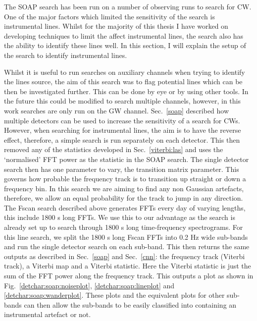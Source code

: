 The SOAP search has been run on a number of observing runs to search for \ac{CW}. 
One of the major factors which limited the sensitivity of the search is instrumental lines. 
Whilst for the majority of this thesis I have worked on developing techniques to limit the affect instrumental lines, the search also has the ability to identify these lines well.
In this section, I will explain the setup of the search to identify instrumental lines.

Whilst it is useful to run searches on auxiliary channels when trying to identify the lines source, the aim of this search was to flag potential lines which can be then be investigated further.
This can be done by eye or by using other tools. 
In the future this could be modified to search multiple channels, however, in this work searches are only run on the \ac{GW} channel. 
Sec.~\ref{soap} described how multiple detectors can be used to increase the sensitivity of a search for \acp{CW}. 
However, when searching for instrumental lines, the aim is to have the reverse effect, therefore, a simple search is run separately on each detector. 
This then removed any of the statistics developed in Sec.~\ref{viterbi:las} and uses the `normalised' \ac{FFT} power as the statistic in the SOAP search.
The single detector search then has one parameter to vary, the transition matrix parameter. 
This governs how probable the frequency track is to transition up straight or down a frequency bin.
In this search we are aiming to find any non Gaussian artefacts, therefore, we allow an equal probability for the track to jump in any direction. 
The Fscan search described above generates \acp{FFT} every day of varying lengths, this include 1800 s long \acp{FFT}. 
We use this to our advantage as the search is already set up to search through 1800 s long time-frequency spectrograms. 
For this line search, we split the 1800 s long Fscan \acp{FFT} into 0.2 Hz wide sub-bands and run the single detector search on each sub-band. 
This then returns the same outputs as described in Sec.~\ref{soap} and Sec.~\ref{cnn}: the frequency track (Viterbi track), a Viterbi map and a Viterbi statistic. 
Here the Viterbi statistic is just the sum of the \ac{FFT} power along the frequency track. 
This outputs a plot as shown in Fig.~\ref{detchar:soap:noiseplot}, \ref{detchar:soap:lineplot} and \ref{detchar:soap:wanderplot}.
These plots and the equivalent plots for other sub-bands can then allow the sub-bands to be easily classified into containing an instrumental artefact or not. 


